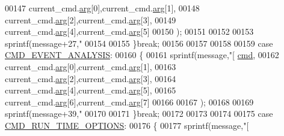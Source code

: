 \begin{DoxyCode}
{{{{{{{{{{00147                                     current\_cmd.\hyperlink{a00001_a56e6c2d7315d0ae60a51e8b140c9cfe4}{arg}[0],current\_cmd.\hyperlink{a00001_a56e6c2d7315d0ae60a51e8b140c9cfe4}{arg}[1],
00148                                     current\_cmd.\hyperlink{a00001_a56e6c2d7315d0ae60a51e8b140c9cfe4}{arg}[2],current\_cmd.\hyperlink{a00001_a56e6c2d7315d0ae60a51e8b140c9cfe4}{arg}[3],
00149                                     current\_cmd.\hyperlink{a00001_a56e6c2d7315d0ae60a51e8b140c9cfe4}{arg}[4],current\_cmd.\hyperlink{a00001_a56e6c2d7315d0ae60a51e8b140c9cfe4}{arg}[5]
00150                                     );
00151 
00152 
00153        sprintf(message+27,\textcolor{stringliteral}{"%
00154 
00155        \}\textcolor{keywordflow}{break};
00156 
00157 
00158 
00159        \textcolor{keywordflow}{case} \hyperlink{a00031_a3a15793e3ab7817f2429edf04de693a0}{CMD\_EVENT\_ANALYSIS}:
00160        \{
00161        sprintf(message,\textcolor{stringliteral}{"[%
      \hyperlink{a00001_af20664dc9ca2b752c73d524edee0e07a}{cmd},
00162                                     current\_cmd.\hyperlink{a00001_a56e6c2d7315d0ae60a51e8b140c9cfe4}{arg}[0],current\_cmd.\hyperlink{a00001_a56e6c2d7315d0ae60a51e8b140c9cfe4}{arg}[1],
00163                                     current\_cmd.\hyperlink{a00001_a56e6c2d7315d0ae60a51e8b140c9cfe4}{arg}[2],current\_cmd.\hyperlink{a00001_a56e6c2d7315d0ae60a51e8b140c9cfe4}{arg}[3],
00164                                     current\_cmd.\hyperlink{a00001_a56e6c2d7315d0ae60a51e8b140c9cfe4}{arg}[4],current\_cmd.\hyperlink{a00001_a56e6c2d7315d0ae60a51e8b140c9cfe4}{arg}[5],
00165                                     current\_cmd.\hyperlink{a00001_a56e6c2d7315d0ae60a51e8b140c9cfe4}{arg}[6],current\_cmd.\hyperlink{a00001_a56e6c2d7315d0ae60a51e8b140c9cfe4}{arg}[7]
00166 
00167                                     );
00168 
00169        sprintf(message+39,\textcolor{stringliteral}{"%
00170 
00171        \}\textcolor{keywordflow}{break};
00172 
00173 
00174 
00175    \textcolor{keywordflow}{case} \hyperlink{a00031_a1d8673a7ca545f3e382fc538f543ab72}{CMD\_RUN\_TIME\_OPTIONS}:
00176        \{
00177        sprintf(message,\textcolor{stringliteral}{"[%
}}}}}}}}}}}}}}
\end{DoxyCode}

